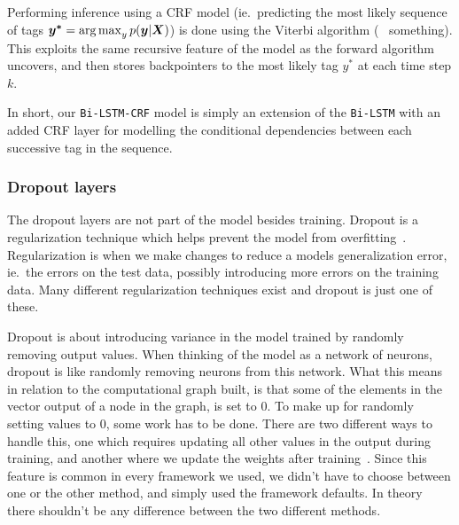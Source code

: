 Performing inference using a CRF model (ie.\ predicting the most likely sequence
of tags $\bm{y^{*}} = \operatorname*{arg\,max}_{y}p(\bm{y}|\bm{X})$) is done using the Viterbi
algorithm (~\cite{sutton2012introduction} something). This exploits the same
recursive feature of the model as the forward algorithm uncovers, and then
stores backpointers to the most likely tag $y^{*}$ at each time step $k$.

In short, our \texttt{Bi-LSTM-CRF} model is simply an extension of the
\texttt{Bi-LSTM} with an added CRF layer for modelling the conditional
dependencies between each successive tag in the sequence.

\subsubsection{Dropout layers}

The dropout layers are not part of the model besides training. Dropout is a
regularization technique which helps prevent the model from
overfitting~\cite{goodfellow2016deep}. Regularization is when we make changes to
reduce a models generalization error, ie.\ the errors on the test data, possibly
introducing more errors on the training data. Many different regularization
techniques exist and dropout is just one of these.

Dropout is about introducing variance in the model trained by randomly removing
output values. When thinking of the model as a network of neurons, dropout is
like randomly removing neurons from this network. What this means in relation to
the computational graph built, is that some of the elements in the vector output
of a node in the graph, is set to 0. To make up for randomly setting values to
0, some work has to be done. There are two different ways to handle this, one
which requires updating all other values in the output during training, and
another where we update the weights after training~\cite{goodfellow2016deep}.
Since this feature is common in every framework we used, we didn't have to
choose between one or the other method, and simply used the framework defaults.
In theory there shouldn't be any difference between the two different methods.

